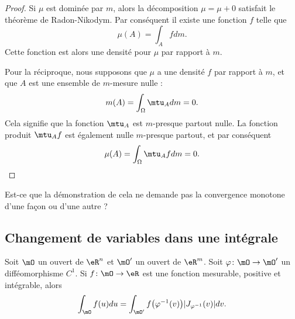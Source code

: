 \begin{proof}
    Si \( \mu\) est dominée par \( m\), alors la décomposition \( \mu=\mu+0\) satisfait le théorème de Radon-Nikodym. Par conséquent il existe une fonction \( f\) telle que
    \begin{equation}
        \mu(A)=\int_Afdm.
    \end{equation}
    Cette fonction est alors une densité pour \( \mu\) par rapport à \( m\).

    Pour la réciproque, nous supposons que \( \mu\) a une densité \( f\) par rapport à \( m\), et que \( A\) est une ensemble de \( m\)-mesure nulle :
    \begin{equation}
        m(A)=\int_{\Omega}\mtu_Adm=0.
    \end{equation}
    Cela signifie que la fonction \( \mtu_A\) est \( m\)-presque partout nulle. La fonction produit \( \mtu_Af\) est également nulle \( m\)-presque partout, et par conséquent
    \begin{equation}
        \mu(A)=\int_{\Omega}\mtu_Afdm=0.
    \end{equation}
\end{proof}

\begin{probleme}
    Est-ce que la démonstration de cela ne demande pas la convergence monotone d'une façon ou d'une autre ?
\end{probleme}

\subsection{Changement de variables dans une intégrale}

\begin{theorem} \label{ThomFeRCi}
    Soit \( \mO\) un ouvert de \( \eR^n\) et \( \mO'\) un ouvert de \( \eR^m\). Soit \( \varphi\colon \mO\to \mO'\) un difféomorphisme \( C^1\). Si \( f\colon \mO\to \eR\) est une fonction mesurable, positive et intégrable, alors
    \begin{equation}
        \int_{\mO}f(u)du=\int_{\mO'}f\big( \varphi^{-1}(v) \big)| J_{\varphi^{-1}}(v) |dv.
    \end{equation}
\end{theorem}

